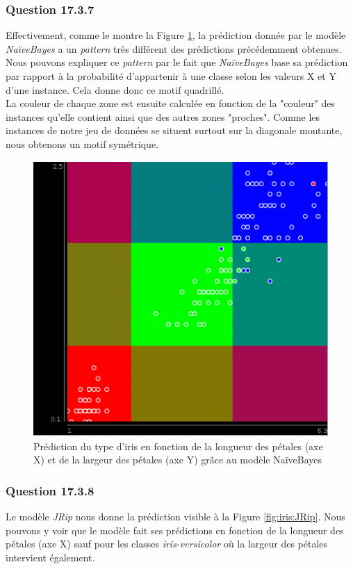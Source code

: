 \documentclass[11pt,a4paper]{article}
\begin{document}
			\subsubsection*{Question 17.3.7}
			
			Effectivement, comme le montre la Figure \ref{fig:iris:NaiveBayes}, la prédiction donnée par le modèle \textit{NaïveBayes} a un \textit{pattern} très différent des prédictions précédemment obtenues.\\
			
			Nous pouvons expliquer ce \textit{pattern} par le fait que \textit{NaïveBayes} base sa prédiction par rapport à la probabilité d'appartenir à une classe selon les valeurs X et Y d'une instance. Cela donne donc ce motif quadrillé.\\
			
			La couleur de chaque zone est ensuite calculée en fonction de la "couleur" des instances qu'elle contient ainsi que des autres zones "proches". Comme les instances de notre jeu de données se situent surtout sur la diagonale montante, nous obtenons un motif symétrique.	
			
			\begin{figure}[]
				\centering
				\includegraphics[width=.5\textwidth]{iris_NaiveBayes}
				\caption{Prédiction du type d'iris en fonction de la longueur des pétales (axe X) et de la largeur des pétales (axe Y) grâce au modèle NaïveBayes}
				\label{fig:iris:NaiveBayes}
			\end{figure}
			
			\subsubsection*{Question 17.3.8}
			
			Le modèle \textit{JRip} nous donne la prédiction visible à la Figure \ref{fig:iris:JRip}. Nous pouvons y voir que le modèle fait ses prédictions en fonction de la longueur des pétales (axe X) sauf pour les classes \textit{iris-versicolor} où la largeur des pétales intervient également.\\
			
\end{document}

